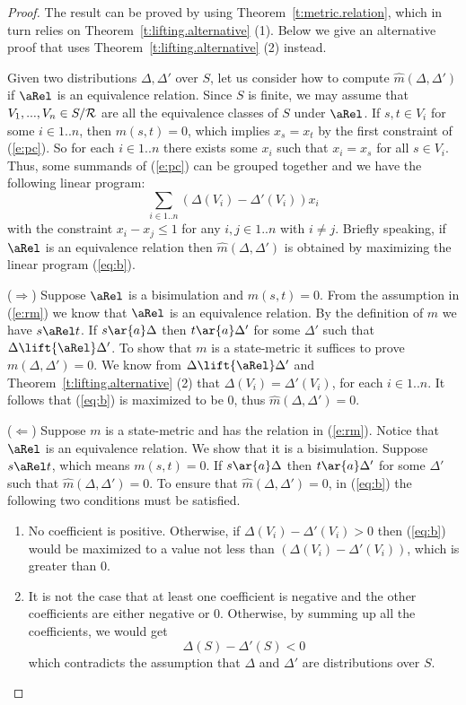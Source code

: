 \documentclass{article}
\begin{document}
\begin{proof}
The result can be proved by using Theorem~\ref{t:metric.relation},
which in turn relies on Theorem~\ref{t:lifting.alternative} (1).
Below we give an alternative proof that uses
Theorem~\ref{t:lifting.alternative} (2) instead.

Given two distributions $\Delta,\Delta'$ over $S$, let us consider
how to compute $\hat{m}(\Delta,\Delta')$ if $\aRel$ is an
equivalence relation. Since $S$ is finite, we may assume that
$V_1,...,V_n\in S/{\cal R}$ are all the equivalence classes of $S$
under $\aRel$. If $s,t\in V_i$ for some $i\in 1..n$, then
$m(s,t)=0$, which implies $x_s=x_t$ by the first constraint of
(\ref{e:pc}). So for each $i\in 1..n$ there exists some $x_i$ such
that $x_i=x_s$ for all $s\in V_i$.
 Thus, some
summands of (\ref{e:pc}) can be grouped together and we have the
following linear program:
\begin{equation}\label{eq:b}
\sum_{i\in 1..n}(\Delta(V_i)-\Delta'(V_i))x_{i}
\end{equation}
with the constraint $x_{i}-x_{j}\leq 1$ for any $i,j\in 1..n$ with
$i\not=j$. Briefly speaking, if $\aRel$ is an equivalence relation
then $\hat{m}(\Delta,\Delta')$ is obtained by maximizing the linear
program (\ref{eq:b}).

($\Rightarrow$) Suppose $\aRel$ is a bisimulation and $m(s,t)=0$.
From the assumption in (\ref{e:rm}) we know that $\aRel$ is an
equivalence relation.
 By the definition of
$m$ we have $s\aRel t$. If $s\ar{a}\Delta$ then $t\ar{a}\Delta'$ for
some $\Delta'$ such that $\Delta\lift{\aRel}\Delta'$. To show that
$m$ is a state-metric it suffices to prove $m(\Delta,\Delta')=0$. We
know from $\Delta\lift{\aRel}\Delta'$  and
Theorem~\ref{t:lifting.alternative} (2) that
$\Delta(V_i)=\Delta'(V_i)$, for each $i\in 1..n$. It follows that
(\ref{eq:b}) is maximized to be $0$, thus
$\hat{m}(\Delta,\Delta')=0$.

($\Leftarrow$) Suppose $m$ is a state-metric and has the relation in
(\ref{e:rm}).
 Notice that $\aRel$ is
an equivalence relation. We show that it is a bisimulation. Suppose
$s\aRel t$, which means $m(s,t)=0$. If $s\ar{a}\Delta$ then
$t\ar{a}\Delta'$ for some $\Delta'$ such that
$\hat{m}(\Delta,\Delta')=0$. To ensure that
$\hat{m}(\Delta,\Delta')=0$, in (\ref{eq:b}) the following two
conditions must be satisfied.
\begin{enumerate}
\item No coefficient is positive. Otherwise, if
  $\Delta(V_i)-\Delta'(V_i)>0$ then (\ref{eq:b}) would be
  maximized to a value not less than
  $(\Delta(V_i)-\Delta'(V_i))$, which is greater than $0$.
\item It is not the case that at least one coefficient is negative and the
  other coefficients are either negative or $0$. Otherwise, by summing up
   all the coefficients, we would get
  \[\Delta(S)-\Delta'(S)<0\]
which contradicts the assumption that $\Delta$ and $\Delta'$ are
distributions over $S$.
\end{enumerate}


\end{proof}
\end{document}
